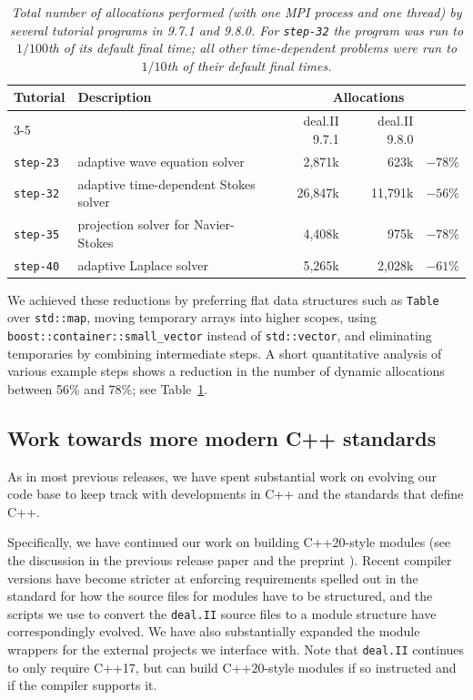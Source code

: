 \documentclass{ansarticle-preprint}
\newcommand{\specialword}[1]{\texttt{#1}}
\newcommand{\dealii}{{\specialword{deal.II}}\xspace}
\newcommand{\step}[1]{{\specialword{step-#1}}\xspace}
\begin{document}
\begin{table}
  \caption{\it Total number of allocations performed (with one MPI process
    and one thread) by several tutorial programs in 9.7.1 and 9.8.0. For
    \step{32} the program was run to $1/100$th of its default final time;
    all other time-dependent problems were run to $1/10$th of their
    default final times.}
  \label{tab:memory_allocations}
  \begin{tabular}{llrrr}
    \toprule
    \bfseries Tutorial & \bfseries Description & \multicolumn{3}{c}{\bfseries Allocations}
    \\
    \cmidrule(lr){3-5}
    & & deal.II 9.7.1 & deal.II 9.8.0
    \\[0.5em]
    \step{23} & adaptive wave equation solver         & 2,871k   & 623k     & $-78\%$\\
    \step{32} & adaptive time-dependent Stokes solver & 26,847k  & 11,791k  & $-56\%$\\
    \step{35} & projection solver for Navier-Stokes   & 4,408k   & 975k     & $-78\%$\\
    \step{40} & adaptive Laplace solver               & 5,265k   & 2,028k   & $-61\%$\\
    \bottomrule
  \end{tabular}
\end{table}

We achieved these reductions by preferring flat data structures such as
\texttt{Table} over \texttt{std::map}, moving temporary arrays into
higher scopes, using \texttt{boost::container::small\_vector} instead of
\texttt{std::vector}, and eliminating temporaries by combining
intermediate steps. A short quantitative analysis of various example steps
shows a reduction in the number of dynamic allocations between 56\% and 78\%; see
Table~\ref{tab:memory_allocations}.


\subsection{Work towards more modern C++ standards}
\label{subsec:cxx}

As in most previous releases, we have spent substantial work on
evolving our code base to keep track with developments in C++ and the
standards that define C++.

Specifically, we have continued our work on building C++20-style
modules (see the discussion in the previous release paper
\cite{dealii97} and the preprint
\cite{bangerth2025experienceconvertinglargemathematical}). Recent
compiler versions have become stricter at enforcing requirements
spelled out in the standard for how the source files for modules have to be
structured, and the scripts we use to convert the \dealii{} source
files to a module structure have correspondingly evolved. We have also
substantially expanded the module wrappers for the external projects
we interface with. Note that \dealii{} continues to only require
C++17, but can build C++20-style modules if so instructed and if the
compiler supports it.
\end{document}
